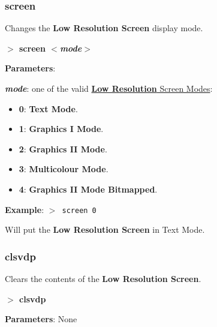         \subsubsection{{screen}}
        Changes the \textbf{Low Resolution Screen} display mode.

        \hspace{1.9cm}\textbf{$>$ screen \textit{$<$mode$>$}}

        \textbf{Parameters}:

        \hspace{1cm}\textbf{\textit{mode}}: one of the valid
        \hyperref[sec:vdpscrmodes]{\textbf{Low Resolution} Screen Modes}:

        \begin{itemize}
            \item \textbf{0}: \textbf{Text Mode}.
            \item \textbf{1}: \textbf{Graphics I Mode}.
            \item \textbf{2}: \textbf{Graphics II Mode}.
            \item \textbf{3}: \textbf{Multicolour Mode}.
            \item \textbf{4}: \textbf{Graphics II Mode Bitmapped}.
        \end{itemize}
        
        \textbf{Example}: \texttt{$>$ screen 0}

        Will put the \textbf{Low Resolution Screen} in Text Mode.

        \subsubsection{{clsvdp}}
        Clears the contents of the \textbf{Low Resolution Screen}.

        \hspace{1.9cm}\textbf{$>$ clsvdp}

        \textbf{Parameters}: None